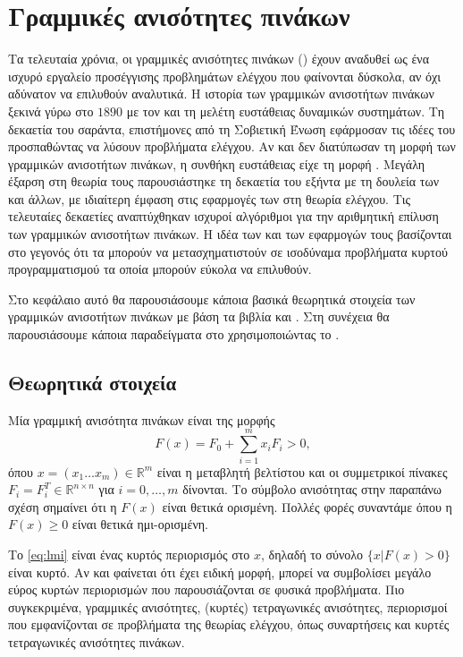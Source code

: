 \chapter{Γραμμικές ανισότητες πινάκων}\label{ch:lmi}
Τα τελευταία χρόνια, οι γραμμικές ανισότητες πινάκων () έχουν αναδυθεί
ως ένα ισχυρό εργαλείο προσέγγισης προβλημάτων ελέγχου που φαίνονται δύσκολα, αν
όχι αδύνατον να επιλυθούν αναλυτικά. Η ιστορία των γραμμικών ανισοτήτων πινάκων
ξεκινά γύρω στο \(1890\) με τον  και τη μελέτη ευστάθειας δυναμικών
συστημάτων. Τη δεκαετία του σαράντα, επιστήμονες από τη Σοβιετική Ένωση
εφάρμοσαν τις ιδέες του  προσπαθώντας να λύσουν προβλήματα ελέγχου.
Αν και δεν διατύπωσαν τη μορφή των γραμμικών ανισοτήτων πινάκων, η συνθήκη
ευστάθειας είχε τη μορφή . Μεγάλη έξαρση στη θεωρία τους
παρουσιάστηκε τη δεκαετία του εξήντα με τη δουλεία των  και άλλων, με ιδιαίτερη έμφαση στις εφαρμογές των  στη θεωρία
ελέγχου. Τις τελευταίες δεκαετίες αναπτύχθηκαν ισχυροί αλγόριθμοι για την
αριθμητική επίλυση των γραμμικών ανισοτήτων πινάκων. Η ιδέα των  και των
εφαρμογών τους βασίζονται στο γεγονός ότι τα  μπορούν να
μετασχηματιστούν σε ισοδύναμα προβλήματα κυρτού προγραμματισμού τα οποία μπορούν
εύκολα να επιλυθούν.

Στο κεφάλαιο αυτό θα παρουσιάσουμε κάποια βασικά θεωρητικά στοιχεία των
γραμμικών ανισοτήτων πινάκων με βάση τα βιβλία \cite{boyd1994linear} και
\cite{scherer2011linear}. Στη συνέχεια θα παρουσιάσουμε κάποια
παραδείγματα  στο  χρησιμοποιώντας το .

\section{Θεωρητικά στοιχεία}
Μία γραμμική ανισότητα πινάκων είναι της μορφής
\begin{equation}\label{eq:lmi}
    F(x) = F_0 + \sum_{i=1}^m x_iF_i > 0,
\end{equation}
όπου \(x = (x_1 \dots x_m) \in \mathbb{R}^m\) είναι η μεταβλητή βελτίστου και οι
συμμετρικοί πίνακες \(F_i = F_i^T \in \mathbb{R}^{n \times n} \) για \(i = 0,
\dots, m \) δίνονται. Το σύμβολο ανισότητας στην παραπάνω σχέση σημαίνει ότι η
\(F(x)\) είναι θετικά ορισμένη. Πολλές φορές συναντάμε  όπου η \(F(x)
\geq 0\) είναι θετικά ημι-ορισμένη. 

Το  \eqref{eq:lmi} είναι ένας κυρτός περιορισμός στο \(x\), δηλαδή το σύνολο
\( \{ x | F(x) > 0 \} \) είναι κυρτό. Αν και φαίνεται ότι  έχει
ειδική μορφή, μπορεί να συμβολίσει μεγάλο εύρος κυρτών περιορισμών που
παρουσιάζονται σε φυσικά προβλήματα. Πιο συγκεκριμένα, γραμμικές ανισότητες,
(κυρτές) τετραγωνικές ανισότητες, περιορισμοί που εμφανίζονται σε προβλήματα
της θεωρίας ελέγχου, όπως συναρτήσεις  και κυρτές τετραγωνικές
ανισότητες πινάκων.

